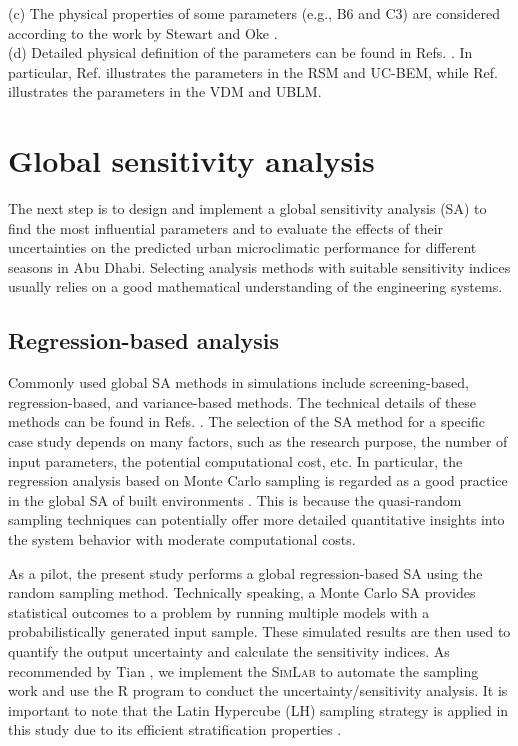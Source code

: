 \begin{table}[]
(c) The physical properties of some parameters (e.g., B6 and C3) are considered according to the work by Stewart and Oke \cite{stewart2012local}. \\
(d) Detailed physical definition of the parameters can be found in Refs. \cite{bueno2013urban,bueno2013calculation}. In particular, Ref. \cite{bueno2013urban} illustrates the parameters in the RSM and UC-BEM, while Ref. \cite{bueno2013calculation} illustrates the parameters in the VDM and UBLM.

\end{table}

\section{Global sensitivity analysis}

The next step is to design and implement a global sensitivity analysis (SA) to find the most influential parameters and to evaluate the effects of their uncertainties on the predicted urban microclimatic performance for different seasons in Abu Dhabi. Selecting analysis methods with suitable sensitivity indices usually relies on a good mathematical understanding of the engineering systems.

\subsection{Regression-based analysis}

Commonly used global SA methods in simulations include screening-based, regression-based, and variance-based methods. The technical details of these methods can be found in Refs. \cite{saltelli2004sensitivity,helton2006survey,storlie2009implementation}. The selection of the SA method for a specific case study depends on many factors, such as the research purpose, the number of input parameters, the potential computational cost, etc. In particular, the regression analysis based on Monte Carlo sampling is regarded as a good practice in the global SA of built environments \cite{de2009identification,eisenhower2012uncertainty,nguyen2015performance,menberg2016sensitivity}. This is because the quasi-random sampling techniques can potentially offer more detailed quantitative insights into the system behavior with moderate computational costs.

As a pilot, the present study performs a global regression-based SA using the random sampling method. Technically speaking, a Monte Carlo SA provides statistical outcomes to a problem by running multiple models with a probabilistically generated input sample. These simulated results are then used to quantify the output uncertainty and calculate the sensitivity indices. As recommended by Tian \cite{tian2013review}, we implement the \textsc{SimLab} \cite{simlab2} to automate the sampling work and use the \textsc{R} program \cite{pujolglobal} to conduct the uncertainty/sensitivity analysis. It is important to note that the Latin Hypercube (LH) sampling strategy is applied in this study due to its efficient stratification properties \cite{helton2006survey}.

